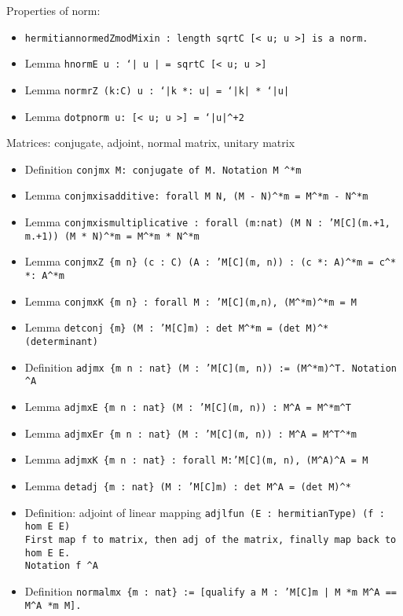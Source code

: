 \noindent Properties of norm:
\begin{itemize}
\item \tt{hermitian\us normedZmodMixin :} length \tt{\bs sqrtC [< u; u >]} is a norm.
\item Lemma \tt{hnormE u : `| u | = \bs sqrtC [< u; u >]}
\item Lemma \tt{normrZ (k:C) u : `|k *: u| = `|k| * `|u|}
\item Lemma \tt{dotp\us norm u: [< u; u >] = `|u|\^{}+2}
\end{itemize}

\noindent Matrices: conjugate, adjoint, normal matrix, unitary matrix
\begin{itemize}
\item Definition \tt{conjmx M}: conjugate of M. Notation \tt{M \^{}*m}
\item Lemma \tt{conjmx\us is\us additive: forall M N, (M - N)\^{}*m = M\^{}*m - N\^{}*m}
\item Lemma \tt{conjmx\us is\us multiplicative : forall (m:nat) (M N : 'M[C]\us(m.+1, m.+1)) (M * N)\^{}*m = M\^{}*m * N\^{}*m}
\item Lemma \tt{conjmxZ \{m n\} (c : C) (A : 'M[C]\us(m, n)) : (c *: A)\^{}*m = c\^{}* *: A\^{}*m}
\item Lemma \tt{conjmxK \{m n\} : forall M : 'M[C]\us(m,n), (M\^{}*m)\^{}*m = M}
\item Lemma \tt{det\us conj \{m\} (M : 'M[C]\us m) : \bs det M\^{}*m = (\bs det M)\^{}*} (determinant)
\item Definition \tt{adjmx \{m n : nat\} (M : 'M[C]\us(m, n)) := (M\^{}*m)\^{}T}. Notation \tt{\us\^{}A}
\item Lemma \tt{adjmxE \{m n : nat\} (M : 'M[C]\us (m, n)) : M\^{}A = M\^{}*m\^{}T}
\item Lemma \tt{adjmxEr \{m n : nat\} (M : 'M[C]\us (m, n)) : M\^{}A = M\^{}T\^{}*m}
\item Lemma \tt{adjmxK \{m n : nat\} : forall M:'M[C]\us(m, n), (M\^{}A)\^{}A = M}
\item Lemma \tt{det\us adj \{m : nat\} (M : 'M[C]\us m) : \bs det M\^{}A = (\bs det M)\^{}*}
\item Definition: adjoint of linear mapping \tt{adj\us lfun (E : hermitianType) (f : hom E E)} \\
		First map f to matrix, then adj of the matrix, finally map back to hom E E. \\
		Notation \tt{f \^{}A}
\item Definition \tt{normalmx \{m : nat\} :=
  [qualify a M : 'M[C]\us m | M *m M\^{}A == M\^{}A *m M]}. 

\end{itemize}
